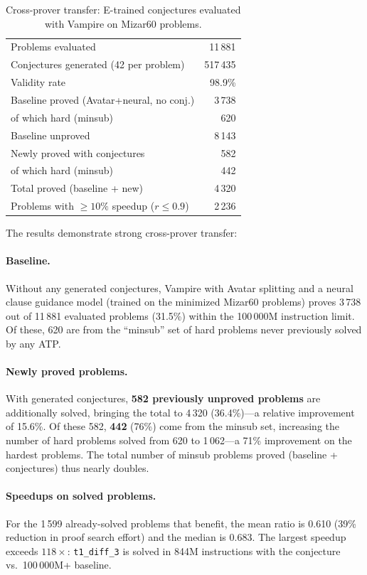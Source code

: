 \documentclass{easychair}
\newcommand{\Eprover}{E\xspace}
\newcommand{\Vampire}{Vampire\xspace}
\begin{document}
\begin{table}[t]
\centering
\caption{Cross-prover transfer: \Eprover-trained conjectures
  evaluated with \Vampire on Mizar60 problems.}
\label{tab:transfer}
\begin{tabular}{lr}
\toprule
Problems evaluated & 11\,881 \\
Conjectures generated (42 per problem) & 517\,435 \\
Validity rate & 98.9\% \\
\midrule
Baseline proved (Avatar+neural, no conj.) & 3\,738 \\
\quad of which hard (minsub) & 620 \\
Baseline unproved & 8\,143 \\
\midrule
Newly proved with conjectures & 582 \\
\quad of which hard (minsub) & 442 \\
Total proved (baseline + new) & 4\,320 \\
Problems with $\geq 10\%$ speedup ($r \leq 0.9$) & 2\,236 \\
\bottomrule
\end{tabular}
\end{table}

The results demonstrate strong cross-prover transfer:

\paragraph{Baseline.}
Without any generated conjectures, \Vampire with Avatar splitting
and a neural clause guidance model (trained on the minimized Mizar60
problems) proves 3\,738 out of 11\,881 evaluated problems (31.5\%)
within the 100\,000M instruction limit.  Of these, 620 are from the
``minsub'' set of hard problems never previously solved by any ATP.

\paragraph{Newly proved problems.}
With generated conjectures, \textbf{582 previously unproved problems}
are additionally solved, bringing the total to 4\,320 (36.4\%)---a
relative improvement of 15.6\%.  Of these 582, \textbf{442} (76\%)
come from the minsub set, increasing the number of hard problems
solved from 620 to 1\,062---a 71\% improvement on the hardest
problems.  The total number of minsub problems proved (baseline +
conjectures) thus nearly doubles.

\paragraph{Speedups on solved problems.}
For the 1\,599 already-solved problems that benefit, the mean ratio
is 0.610 (39\% reduction in proof search effort) and the median is
0.683.  The largest speedup exceeds $118\times$: \texttt{t1\_diff\_3}
is solved in 844M instructions with the conjecture vs.\ 100\,000M+
baseline.
\end{document}
